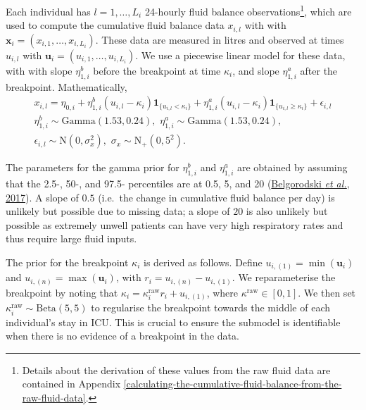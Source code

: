 \documentclass[
  10pt,
  a4paper,
]{article}
\begin{document}
Each individual has \(l = 1, \ldots, L_{i}\) 24-hourly fluid balance
observations\footnote{Details about the derivation of these values from
  the raw fluid data are contained in Appendix
  \ref{calculating-the-cumulative-fluid-balance-from-the-raw-fluid-data}.},
which are used to compute the cumulative fluid balance data \(x_{i, l}\)
with with \(\boldsymbol{x}_{i} = (x_{i, 1}, \ldots, x_{i, L_{i}})\).
These data are measured in litres and observed at times \(u_{i, l}\)
with \(\boldsymbol{u}_{i} = (u_{i, 1}, \ldots, u_{i, L_{i}})\). We use a
piecewise linear model for these data, with with slope
\(\eta_{1, i}^{b}\) before the breakpoint at time \(\kappa_{i}\), and
slope \(\eta_{1, i}^{a}\) after the breakpoint. Mathematically,
\begin{equation}
\begin{gathered}
  x_{i, l} = \eta_{0, i} + \eta^{b}_{1, i}(u_{i, l} - \kappa_{i})\boldsymbol{1}_{\{u_{i, l} < \kappa_{i}\}} + \eta^{a}_{1, i}(u_{i, l} - \kappa_{i})\boldsymbol{1}_{\{u_{i, l} \geq \kappa_{i}\}} + \epsilon_{i, l} \\
  \eta^{b}_{1, i} \sim \text{Gamma}(1.53, 0.24), \,\, \eta^{a}_{1, i} \sim \text{Gamma}(1.53, 0.24), \\
  \epsilon_{i, l} \sim \text{N}(0, \sigma^{2}_{x}),  \,\, \sigma_{x} \sim \text{N}_{+}(0, 5^2).
  \label{eqn:piecewise-fluid-model}
\end{gathered}
\end{equation}

The parameters for the gamma prior for \(\eta^{b}_{1, i}\) and
\(\eta^{a}_{1, i}\) are obtained by assuming that the 2.5-, 50-, and
97.5- percentiles are at 0.5, 5, and 20
(\protect\hyperlink{ref-belgorodski_rriskdistributions_2017}{Belgorodski
\emph{et al.}, 2017}). A slope of \(0.5\) (i.e.~the change in cumulative
fluid balance per day) is unlikely but possible due to missing data; a
slope of \(20\) is also unlikely but possible as extremely unwell
patients can have very high respiratory rates and thus require large
fluid inputs.

The prior for the breakpoint \(\kappa_{i}\) is derived as follows.
Define \(u_{i, (1)} = \min(\boldsymbol{u}_{i})\) and
\(u_{i, (n)} = \max(\boldsymbol{u}_{i})\), with
\(r_{i} = u_{i, (n)} - u_{i, (1)}\). We reparameterise the breakpoint by
noting that \(\kappa_{i} = \kappa^{\text{raw}}_{i}r_{i} + u_{i, (1)}\),
where \(\kappa^{\text{raw}} \in [0, 1]\). We then set
\(\kappa^{\text{raw}}_{i} \sim \text{Beta}(5, 5)\) to regularise the
breakpoint towards the middle of each individual's stay in ICU. This is
crucial to ensure the submodel is identifiable when there is no evidence
of a breakpoint in the data.
\end{document}
